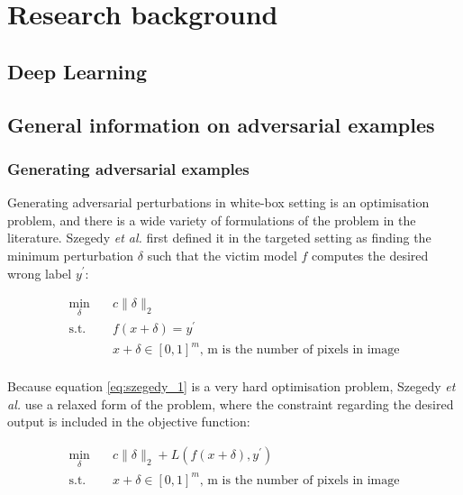 \chapter{Research background}
	\label{chap:background}
	
\section{Deep Learning}

\section{General information on adversarial examples}

\subsection{Generating adversarial examples}

Generating adversarial perturbations in white-box setting is an optimisation problem, and there is a wide variety of formulations of the problem in the literature. Szegedy \textit{et al.} \cite{szegedy2014intriguing} first defined it in the targeted setting as finding the minimum perturbation $\delta$ such that the victim model $f$ computes the desired wrong label $y^\prime$:

\begin{equation}
\label{eq:szegedy_1}
\begin{aligned}
\min_{\delta} \quad & c\|\delta\|_2\\
\textrm{s.t.} \quad & f(x + \delta) = y^\prime\\
  &x + \delta \in [0,1]^m \textrm{, m is the number of pixels in image}   \\
\end{aligned}
\end{equation}

Because equation \ref{eq:szegedy_1} is a very hard optimisation problem, Szegedy \textit{et al.} \cite{szegedy2014intriguing} use a relaxed form of the problem, where the constraint regarding the desired output is included in the objective function:

\begin{equation}
\label{eq:szegedy_2}
\begin{aligned}
\min_{\delta} \quad & c\|\delta\|_2 + L(f(x + \delta), y^\prime)\\
\textrm{s.t.} \quad& x + \delta \in [0,1]^m \textrm{, m is the number of pixels in image}   \\
\end{aligned}
\end{equation}

